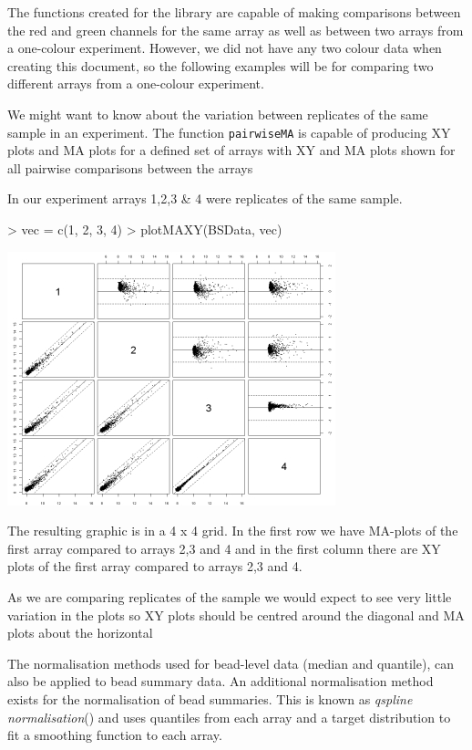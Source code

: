 \documentclass[a4paper]{article}
\newcommand{\Rfunction}[1]{{\texttt{#1}}}
\begin{document}
The functions created for the library are capable of making comparisons between the red and green channels for the same array as well as between two arrays from a one-colour experiment. However, we did not have any two 
colour data when creating this document, so the following examples will be for comparing two different arrays from a one-colour experiment.


We might want to know about the variation between replicates of the same sample in an experiment. The function \Rfunction{pairwiseMA} is capable of producing XY plots and MA plots for a defined set of arrays with XY and MA plots shown for all pairwise comparisons between the arrays

In our experiment arrays 1,2,3 \& 4 were replicates of the same sample.

\begin{center}
\begin{Schunk}
\begin{Sinput}
> vec = c(1, 2, 3, 4)
> plotMAXY(BSData, vec)
\end{Sinput}
\end{Schunk}
\includegraphics{plotMAXY.jpg}

\end{center}

The resulting graphic is in a 4 x 4 grid. In the first row we have MA-plots of the first array compared to arrays 2,3 and 4 and in the first column there are XY plots of the first array compared to arrays 2,3 and 4. 

As we are comparing replicates of the sample we would expect to see very little variation in the plots so XY plots should be centred around the diagonal and MA plots about the horizontal

The normalisation methods used for bead-level data (median and quantile), can also be applied to bead summary data. An additional normalisation method exists for the normalisation of bead summaries. This is known as \emph{qspline normalisation}(\cite{workman}) and uses quantiles from each array and a target distribution to fit a smoothing function to each array. 
\end{document}
